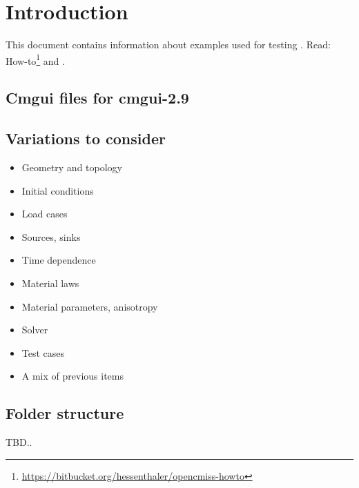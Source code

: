 %
\section{Introduction}
%
This document contains information about examples used for testing \iron.
Read: How-to\footnote{\url{https://bitbucket.org/hessenthaler/opencmiss-howto}}
and \cite{OpenCMISS2011}.
%
%
\subsection{Cmgui files for cmgui-2.9}
%
%
\subsection{Variations to consider}
%
\begin{itemize}
    \item{Geometry and topology}
    \item{Initial conditions}
    \item{Load cases}
    \item{Sources, sinks}
    \item{Time dependence}
    \item{Material laws}
    \item{Material parameters, anisotropy}
    \item{Solver}
    \item{Test cases}
    \item{A mix of previous items}
\end{itemize}
%
%
\subsection{Folder structure}
%
TBD..
%
